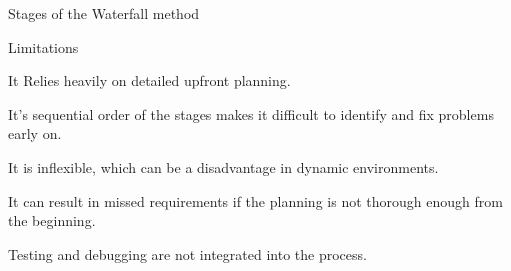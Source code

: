 \begin{frame}{Stages of the Waterfall method}
    \begin{alertblock}{Limitations}
        \item It Relies heavily on detailed upfront planning.
               
        \item It's sequential order of the stages makes it difficult to identify and fix problems early on.
        
        \item It is inflexible, which can be a disadvantage in dynamic environments.
        \
        \item It can result in missed requirements if the planning is not thorough enough from the beginning.
        
        \item Testing and debugging are not integrated into the process.
        
    \end{alertblock}
    
    \end{frame}